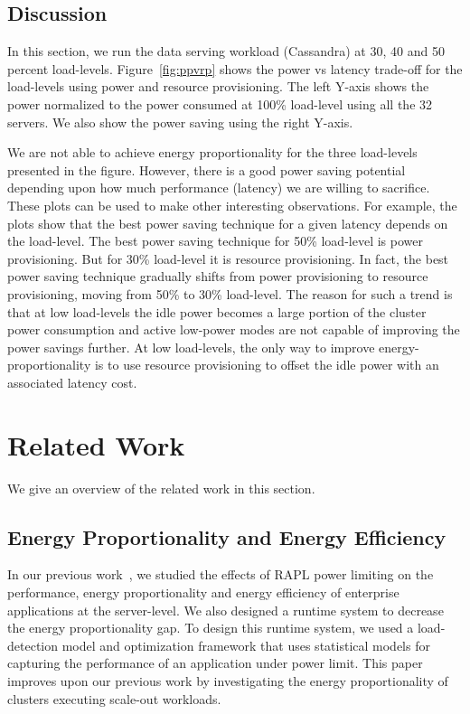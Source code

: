 \documentclass{sig-alternate}
\begin{document}
\subsection{Discussion}

In this section, we run the data serving workload (Cassandra) at 30, 40 and 50 percent 
load-levels. Figure~\ref{fig:ppvrp} shows the power vs latency trade-off for the 
load-levels using power and resource provisioning. The left Y-axis shows the 
power normalized to the power consumed at 100\% load-level using all the 32 servers. 
We also show the power saving using the right Y-axis. 

We are not able to achieve energy proportionality for the three load-levels presented in 
the figure. However, there is a good power saving potential depending upon how much 
performance (latency) we are willing to sacrifice. These plots can be used to make 
other interesting observations. For example, the plots show that the best 
power saving technique for a given latency depends on the load-level. The best power 
saving technique for 50\% load-level is power provisioning. But for 30\% load-level it 
is resource provisioning. In fact, the best 
power saving technique gradually shifts from power provisioning to resource provisioning, 
moving from 50\% to 30\% load-level. The reason for such a trend is that at low load-levels 
the idle power becomes a large portion of the cluster power consumption 
and active low-power modes are not capable of improving the power savings further. At low load-levels, 
the only way to improve energy-proportionality is to use resource provisioning to offset the 
idle power with an associated latency cost.






 \section{Related Work}
\label{sec:related}

We give an overview of the related work in this section. 

\subsection{Energy Proportionality and Energy Efficiency} 
In our previous work~\cite{ccgrid_eprop,icpe_eprop}, we studied
the effects of RAPL power limiting on the performance, energy
proportionality and energy efficiency of enterprise applications at the 
server-level. We also designed a runtime system to decrease the energy 
proportionality gap. To design this runtime system, we used a 
load-detection model and
optimization framework that uses statistical models for capturing the
performance of an application under power limit. This paper improves 
upon our previous work by investigating the energy proportionality of 
clusters executing scale-out workloads. 
\end{document}
